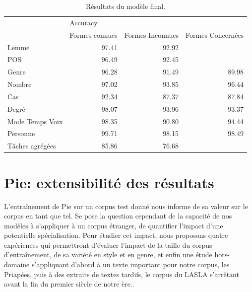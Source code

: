 \begin{table}[ht]
    \begin{tabular}{l|rrr}
    \toprule
                    & \multicolumn{3}{l}{Accuracy}                           \\
                    & Formes connues & Formes Inconnues &  Formes Concernées \\ \midrule
    Lemme           & 97.41          & 92.92            &                    \\
    POS             & 96.49          & 92.45            &                    \\
    Genre           & 96.28          & 91.49            &   89.98            \\
    Nombre          & 97.02          & 93.85            &   96.44            \\
    Cas             & 92.34          & 87.37            &   87.84            \\
    Degré           & 98.07          & 93.96            &   93.37            \\
    Mode Temps Voix & 98.35          & 90.80            &   94.44            \\
    Personne        & 99.71          & 98.15            &   98.49            \\ \midrule
    Tâches agrégées & 85.86          & 76.68            &                    \\ \bottomrule 
    \end{tabular}
    \caption{Résultats du modèle final.}
    \label{tab:modelFinalLemmatisation}
\end{table}

\section{Pie: extensibilité des résultats}

L'entraînement de Pie sur un corpus test donné nous informe de sa valeur sur le corpus en tant que tel. Se pose la question cependant de la capacité de nos modèles à s'appliquer à un corpus étranger, de quantifier l'impact d'une potentielle spécialisation. Pour étudier cet impact, nous proposons quatre expériences qui permettront d'évaluer l'impact de la taille du corpus d'entraînement, de sa variété en style et en genre, et enfin une étude hors-domaine s'appliquant d'abord à un texte important pour notre corpus, les Priapées, puis à des extraits de textes tardifs, le corpus du LASLA s'arrêtant avant la fin du premier siècle de notre ère..

